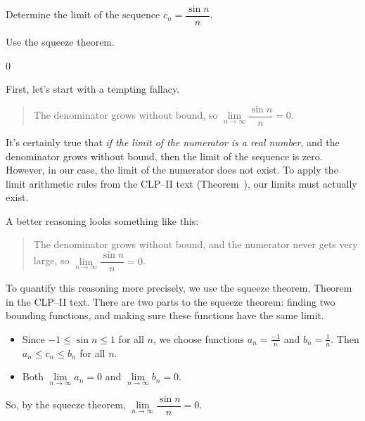 \begin{Mquestion}
Determine the limit of the sequence
$c_n = \dfrac{\sin n}{n}$.
\end{Mquestion}
\begin{hint}
Use the squeeze theorem.
\end{hint}
\begin{answer}
0
\end{answer}
\begin{solution}
First, let's start with a  tempting fallacy.
\begin{quote}\color{red}
The denominator grows without bound, so
$\lim\limits_{n \to \infty}\dfrac{\sin n}{n}=0$.
\end{quote}

It's certainly true that \emph{if the limit of the numerator is a real number}, and the denominator grows without bound, then the limit of the sequence is zero. However, in our case, the limit of the numerator does not exist. To apply the limit arithmetic rules from the CLP--II text (Theorem~), our limits must actually exist.

A better reasoning looks something like this:
\begin{quote}\color{red}
The denominator grows without bound, and the numerator never gets very large, so
$\lim\limits_{n \to \infty}\dfrac{\sin n}{n}=0$.
\end{quote}

To quantify this reasoning more precisely, we use the squeeze theorem, Theorem~ in the CLP--II text. There are two parts to the squeeze theorem: finding two bounding functions, and making sure these functions have the same limit.
\begin{itemize}
\item Since $-1\leq \sin n \leq 1$ for all $n$, we choose functions $a_n = \frac{-1}{n}$ and $b_n = \frac{1}{n}$.  Then $a_n \leq c_n \leq b_n$ for all $n$.
\item Both $\lim\limits_{n \to \infty}a_n=0$ and  $\lim\limits_{n \to \infty}b_n=0$.
\end{itemize}
So, by the squeeze theorem, $\lim\limits_{n \to \infty}\dfrac{\sin n}{n}=0$.
\end{solution}



